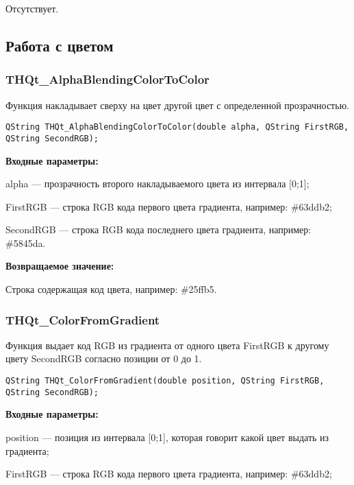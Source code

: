 \documentclass[a4paper,12pt]{article}
\begin{document}
Отсутствует.


\subsection{Работа с цветом}

\subsubsection{THQt\_AlphaBlendingColorToColor}\label{THQt_AlphaBlendingColorToColor}

Функция накладывает сверху на цвет другой цвет с определенной прозрачностью.


\begin{lstlisting}[label=code_syntax_THQt_AlphaBlendingColorToColor,caption=Синтаксис]
QString THQt_AlphaBlendingColorToColor(double alpha, QString FirstRGB, QString SecondRGB);
\end{lstlisting}

\textbf{Входные параметры:}

alpha --- прозрачность второго накладываемого цвета из интервала [0;1];
 
    FirstRGB --- строка RGB кода первого цвета градиента, например: \#63ddb2;
 
    SecondRGB --- строка RGB кода последнего цвета градиента, например: \#5845da.

\textbf{Возвращаемое значение:}

Строка содержащая код цвета, например: \#25ffb5.


\subsubsection{THQt\_ColorFromGradient}\label{THQt_ColorFromGradient}

Функция выдает код RGB из градиента от одного цвета FirstRGB к другому цвету SecondRGB согласно позиции от 0 до 1.


\begin{lstlisting}[label=code_syntax_THQt_ColorFromGradient,caption=Синтаксис]
QString THQt_ColorFromGradient(double position, QString FirstRGB, QString SecondRGB);
\end{lstlisting}

\textbf{Входные параметры:}

position --- позиция из интервала [0;1], которая говорит какой цвет выдать из градиента;
 
    FirstRGB --- строка RGB кода первого цвета градиента, например: \#63ddb2;
 
\end{document}
